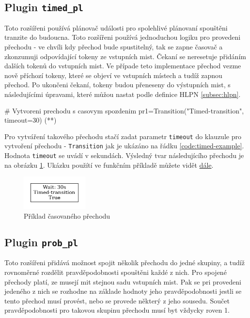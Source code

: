 \subsection{Plugin \texttt{timed\_pl}}
\label{subsec:timed_pl}
Toto rozšířeni používá plánovač události pro spolehlivé plánovaní spouštěni tranzite do budoucna. Toto rozšířeni používá jednoduchou logiku pro provedeni přechodu - ve chvíli kdy přechod bude spustitelný, tak se zapne časovač a zkonzumuji odpovídající tokeny ze vstupních mist. Čekaní se neresetuje přidáním dalších tokenů do vstupních mist. Ve případe teto implementace přechod vezme nově příchozí tokeny, které se objeví ve vstupních místech a tudíž zapnou přechod. Po ukončeni čekaní, tokeny budou přeneseny do výstupních mist, s následujícími úpravami, které můžou nastat podle definice HLPN \ref{subsec:hlpn}.


\begin{python}
  # Vytvoreni prechodu s casovym spozdenim
  pr1=Transition("Timed-transition", timeout=30) (*\label{code:timed-example}*)
\end{python}

Pro vytváření takového přechodu stačí zadat parametr \texttt{timeout} do klauzule pro vytvoření přechodu - \texttt{Transition} jak je ukázáno na řádku \ref{code:timed-example}. Hodnota \texttt{timeout} se uvádí v sekundách. Výsledný tvar následujícího přechodu je na obrázku \ref{timed-transition}. Ukázku použítí ve funkčním příkladě můžete vidět \hyperref[code:timed-temp-example]{dále}.

\begin{figure}[hbt]
  \centering
  \includegraphics[width=0.3\textwidth]{obrazky-figures/timed-transition.png}
  \caption{Příklad časovaného přechodu}
  \label{timed-transition}
\end{figure}

\subsection{Plugin \texttt{prob\_pl}}
\label{subsec:prob_pl}
Toto rozšířeni přidává možnost spojit několik přechodu do jedné skupiny, a tudíž rovnoměrné rozdělit pravděpodobnosti spouštěni každé z nich. Pro spojené přechody platí, ze musejí mit stejnou sadu vstupních mist. Pak se pri provedeni jedeného z nich se rozhodne na základe hodnoty jeho pravděpodobnosti jestli se tento přechod musí provést, nebo se provede některý z jeho sousedu. Součet pravděpodobnosti pro takovou skupinu přechodu musí byt vždycky roven 1.


